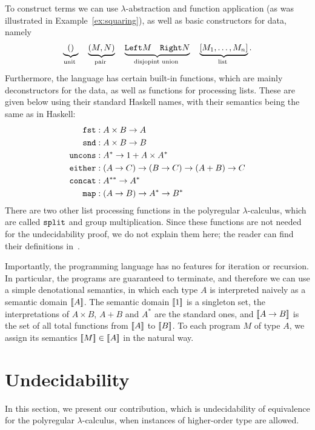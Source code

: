 \documentclass{article}
\begin{document}
To construct terms we can use $\lambda$-abstraction and function application (as was illustrated in Example~\ref{ex:squaring}), as well as basic constructors for data, namely 
\begin{align*}
\myunderbrace{()}{unit} \quad 
\myunderbrace{(M,N)}{pair} \quad 
\myunderbrace{\leftterm M \quad \rightterm N}{disjopint union} \quad \myunderbrace{[M_1,\ldots,M_n]}{list}.
\end{align*}
Furthermore, the language  has certain built-in functions, which are mainly deconstructors for the data, as well as functions for processing lists. These are given below using their standard Haskell names, with their semantics being the same as in Haskell:
 \begin{align*}
     \mathtt{fst} & :  A \times B \to A \\
     \mathtt{snd} & : A \times B \to B \\
        \mathtt{uncons} & : A^* \to 1 + A \times A^* \\
        \mathtt{either} & : (A \to C) \to (B \to C) \to (A + B) \to C \\
    \mathtt{concat} & : A^{**} \to A^* \\
        \mathtt{map} & : (A \to B) \to A^* \to B^* 
    \end{align*}
There are two other list processing functions in the polyregular $\lambda$-calculus, which are  called $\mathtt{split}$ and group multiplication. Since these functions are not needed for the undecidability proof, we do not explain them here; the reader can find their definitions in~\cite[Section 4]{polyregular-survey}.

Importantly, the programming language has no features for iteration or recursion. In particular, the programs are guaranteed to terminate, and therefore we can use a simple denotational semantics, in which each type $A$ is interpreted naively as a semantic domain $[\![A]\!]$. The semantic domain $[\![1]\!]$ is  a singleton set, the interpretations of $A \times B$, $A + B$ and $A^*$ are the standard ones, and $[\![A \to B]\!]$ is the set of all total functions from $[\![A]\!]$ to $[\![B]\!]$. To each program $M$ of type $A$, we assign its semantics $[\![M]\!] \in [\![A]\!]$ in the natural way.
\section{Undecidability}
\label{sec:undecidability}
In this section, we present our contribution, which is undecidability of equivalence for the polyregular $\lambda$-calculus, when instances of higher-order type are allowed. 
\end{document}
